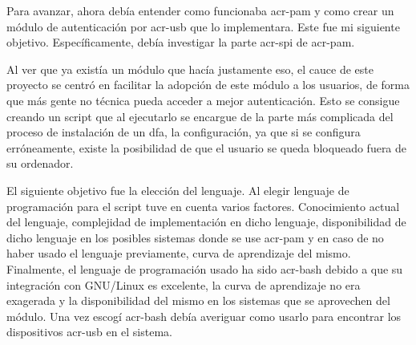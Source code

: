 \documentclass[titlepage, 12pt, a4paper]{article}
\begin{document}
Para avanzar, ahora debía entender como funcionaba \gls{acr-pam} y como crear un módulo de autenticación por \gls{acr-usb} que lo implementara. Este fue mi siguiente objetivo. Específicamente, debía investigar la parte \gls{acr-spi} de \gls{acr-pam}. \par
Al ver que ya existía un módulo que hacía justamente eso, el cauce de este proyecto se centró en facilitar la adopción de este módulo a los usuarios, de forma que más gente no técnica pueda acceder a mejor autenticación. Esto se consigue creando un \gls{script} que al ejecutarlo se encargue de la parte más complicada del proceso de instalación de un \gls{dfa}, la configuración, ya que si se configura erróneamente, existe la posibilidad de que el usuario se queda bloqueado fuera de su ordenador.\par
El siguiente objetivo fue la elección del lenguaje. Al elegir lenguaje de programación para el \gls{script} tuve en cuenta varios factores. Conocimiento actual del lenguaje, complejidad de implementación en dicho lenguaje, disponibilidad de dicho lenguaje en los posibles sistemas donde se use \gls{acr-pam} y en caso de no haber usado el lenguaje previamente, curva de aprendizaje del mismo. Finalmente, el lenguaje de programación usado ha sido \gls{acr-bash} debido a que su integración con \gls{GNU/Linux} es excelente, la curva de aprendizaje no era exagerada y la disponibilidad del mismo en los sistemas que se aprovechen del módulo.
Una vez escogí \gls{acr-bash} debía averiguar como usarlo para encontrar los dispositivos \gls{acr-usb} en el sistema.\par

\clearpage
\end{document}
